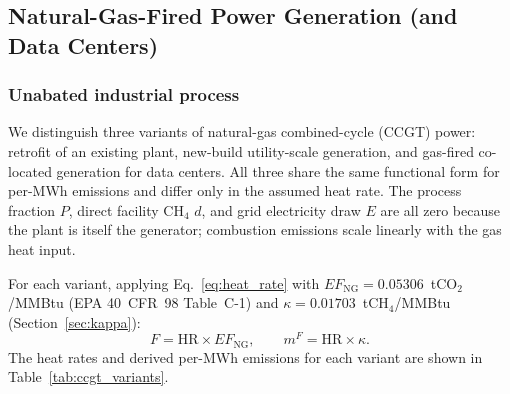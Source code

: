 \documentclass[11pt]{article}
\newcommand{\cotwo}{\ensuremath{\mathrm{CO_2}}}
\newcommand{\chfour}{\ensuremath{\mathrm{CH_4}}}
\begin{document}
\subsection{Natural-Gas-Fired Power Generation (and Data Centers)}
\label{sec:const_ccgt}

\subsubsection{Unabated industrial process}

We distinguish three variants of natural-gas combined-cycle (CCGT) power: retrofit of an existing plant, new-build utility-scale generation, and gas-fired co-located generation for data centers. All three share the same functional form for per-MWh emissions and differ only in the assumed heat rate. The process fraction $P$, direct facility \chfour{} $d$, and grid electricity draw $E$ are all zero because the plant is itself the generator; combustion emissions scale linearly with the gas heat input.

For each variant, applying Eq.~\eqref{eq:heat_rate} with $EF_{\text{NG}} = 0.05306$~t\cotwo{}/MMBtu (EPA 40~CFR~98 Table~C-1) and $\kappa = 0.01703$~t\chfour{}/MMBtu (Section~\ref{sec:kappa}):
%
\[
  F = \mathrm{HR} \times EF_{\text{NG}}, \qquad m^F = \mathrm{HR} \times \kappa.
\]
%
The heat rates and derived per-MWh emissions for each variant are shown in Table~\ref{tab:ccgt_variants}.
\end{document}

